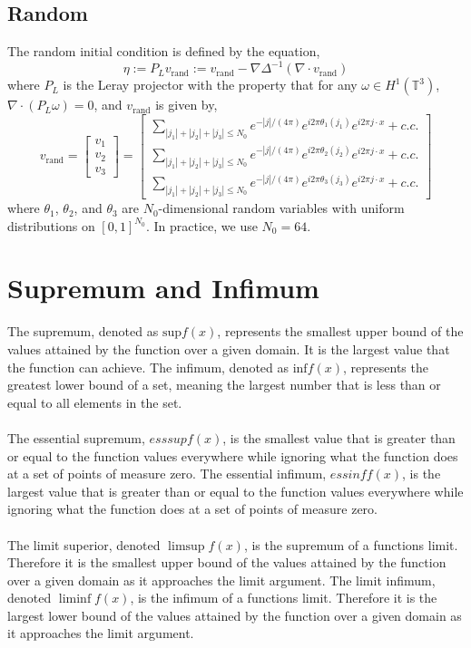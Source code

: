 \documentclass[12pt]{article}
\begin{document}
\begin{flushleft}
\subsection{Random}

The random initial condition is defined by the equation,
$$\eta := P_L v_{\text{rand}} := v_{\text{rand}} - \nabla \Delta^{-1}(\nabla \cdot v_{\text{rand}})$$
where $P_L$ is the Leray projector with the property that for any $\omega\in H^1(\mathbb{T}^3)$, $\nabla\cdot (P_L \omega) = 0$, and $v_{\text{rand}}$ is given by,
$$v_{\text{rand}} = \begin{bmatrix}
v_1\\
v_2\\
v_3
\end{bmatrix} = 
\begin{bmatrix}
\sum_{|j_1|+|j_2|+|j_3|\leq N_0}e^{-|j|/(4\pi)}e^{i2\pi\theta_1(j_1)}e^{i2\pi j\cdot x}+c.c.\\
\sum_{|j_1|+|j_2|+|j_3|\leq N_0}e^{-|j|/(4\pi)}e^{i2\pi\theta_2(j_2)}e^{i2\pi j\cdot x}+c.c.\\
\sum_{|j_1|+|j_2|+|j_3|\leq N_0}e^{-|j|/(4\pi)}e^{i2\pi\theta_3(j_3)}e^{i2\pi j\cdot x}+c.c.
\end{bmatrix}$$
where $\theta_1$, $\theta_2$, and $\theta_3$ are $N_0$-dimensional random variables with uniform distributions on $[0,1]^{N_0}$. In practice, we use $N_0=64$.

\section{Supremum and Infimum}

\qquad The supremum, denoted as $\text{sup} f(x)$, represents the smallest upper bound of the values attained by the function over a given domain. It is the largest value that the function can achieve. The infimum, denoted as $\text{inf} f(x)$, represents the greatest lower bound of a set, meaning the largest number that is less than or equal to all elements in the set.
\\~\\
\qquad The essential supremum, $ess sup f(x)$, is the smallest value that is greater than or equal to the function values everywhere while ignoring what the function does at a set of points of measure zero. The essential infimum, $ess inf f(x)$, is the largest value that is greater than or equal to the function values everywhere while ignoring what the function does at a set of points of measure zero.
\\~\\
\qquad The limit superior, denoted $\limsup f(x)$, is the supremum of a functions limit. Therefore it is the smallest upper bound of the values attained by the function over a given domain as it approaches the limit argument. The limit infimum, denoted $\liminf f(x)$,  is the infimum of a functions limit. Therefore it is the largest lower bound of the values attained by the function over a given domain as it approaches the limit argument.


\end{flushleft}
\end{document}
